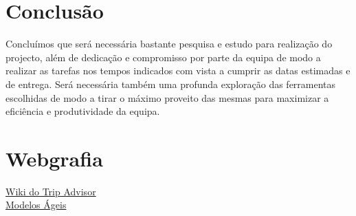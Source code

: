 \documentclass[a4paper]{article}
\begin{document}
\newpage
\section{Conclusão}
Concluímos que será necessária bastante pesquisa e estudo para realização do projecto, além de dedicação e compromisso por parte da equipa de modo a realizar as tarefas nos tempos indicados com vista a cumprir as datas estimadas e de entrega. Será necessária também uma profunda exploração das ferramentas escolhidas de modo a tirar o máximo proveito das mesmas para maximizar a eficiência e produtividade da equipa.

\newpage
\section{Webgrafia}
\href{https://pt.wikipedia.org/wiki/TripAdvisor}{Wiki do Trip Advisor}\\
\href{https://www.projectbuilder.com.br/blog/quais-sao-os-principais-tipos-de-metodos-ageis/}{Modelos Ágeis}


\end{document}

